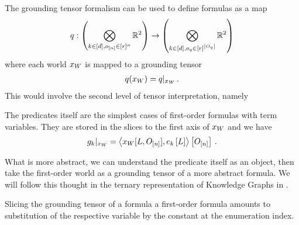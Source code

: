 The grounding tensor formalism can be used to define formulas as a map
\begin{align*}
    q : \left(\bigotimes_{k\in[d],o_{[n]}\in[r]^{n}}\mathbb{R}^{2}\right)
    \rightarrow \left(\bigotimes_{k\in[d],o_{q}\in[r]^{\left|O_{q}\right|}}\mathbb{R}^{2}\right)
\end{align*}
where each world $x_{W}$ is mapped to a grounding tensor
\begin{align*}
    q(x_{W}) = {q}|_{x_{W}} \, .
\end{align*}
This would involve the second level of tensor interpretation, namely



The predicates itself are the simplest cases of first-order formulas with term variables.
They are stored in the slices to the first axis of $x_{W}$ and we have
\begin{align}
    {g_{k}}|_{x_{W}} =
    \left\langle x_{W}[L,O_{[n]}],e_{k}\left[L\right]\right\rangle \left[ O_{[n]} \right] \, .
\end{align}

What is more abstract, we can understand the predicate itself as an object, then take the first-order world as a grounding tensor of a more abstract formula.
We will follow this thought in the ternary representation of Knowledge Graphs in .


Slicing the grounding tensor of a formula a first-order formula amounts to substitution of the respective variable by the constant at the enumeration index.


